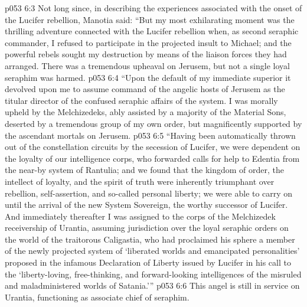 \vs p053 6:3 \pc Not long since, in describing the experiences associated with the onset of the Lucifer rebellion, Manotia said: “But my most exhilarating moment was the thrilling adventure connected with the Lucifer rebellion when, as second seraphic commander, I refused to participate in the projected insult to Michael; and the powerful rebels sought my destruction by means of the liaison forces they had arranged. There was a tremendous upheaval on Jerusem, but not a single loyal seraphim was harmed.
\vs p053 6:4 “Upon the default of my immediate superior it devolved upon me to assume command of the angelic hosts of Jerusem as the titular director of the confused seraphic affairs of the system. I was morally upheld by the Melchizedeks, ably assisted by a majority of the Material Sons, deserted by a tremendous group of my own order, but magnificently supported by the ascendant mortals on Jerusem.
\vs p053 6:5 “Having been automatically thrown out of the constellation circuits by the secession of Lucifer, we were dependent on the loyalty of our intelligence corps, who forwarded calls for help to Edentia from the near\hyp{}by system of Rantulia; and we found that the kingdom of order, the intellect of loyalty, and the spirit of truth were inherently triumphant over rebellion, self\hyp{}assertion, and so\hyp{}called personal liberty; we were able to carry on until the arrival of the new System Sovereign, the worthy successor of Lucifer. And immediately thereafter I was assigned to the corps of the Melchizedek receivership of Urantia, assuming jurisdiction over the loyal seraphic orders on the world of the traitorous Caligastia, who had proclaimed his sphere a member of the newly projected system of ‘liberated worlds and emancipated personalities’ proposed in the infamous Declaration of Liberty issued by Lucifer in his call to the ‘liberty\hyp{}loving, free\hyp{}thinking, and forward\hyp{}looking intelligences of the misruled and maladministered worlds of Satania.’”
\vs p053 6:6 \pc This angel is still in service on Urantia, functioning as associate chief of seraphim.
